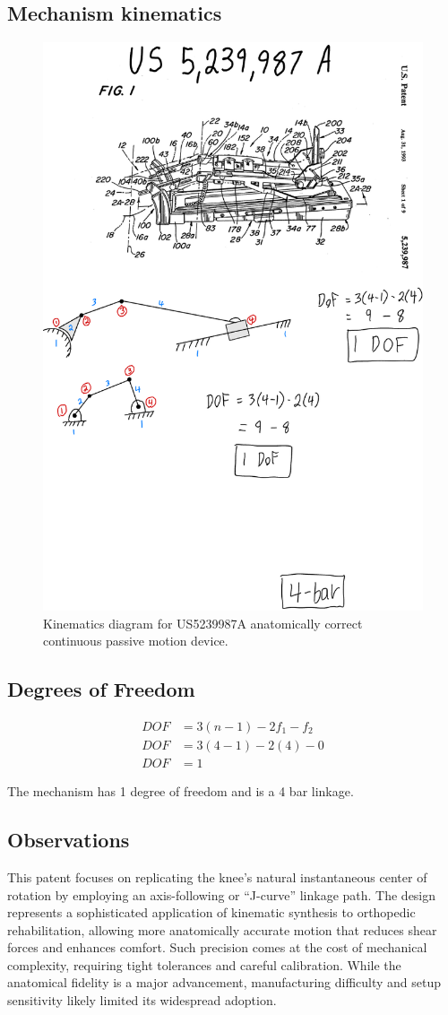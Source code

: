 \documentclass[11pt]{article}
\begin{document}
\subsection{Mechanism kinematics}
\begin{figure}[H]
  \centering
  \includegraphics[width=0.54\linewidth]{../Kinematic Mechanism Images/5239987.png}
  \caption{Kinematics diagram for US5239987A anatomically correct continuous passive motion device.}
  \label{fig:US5239987A_kinematics}
\end{figure}

\subsection{Degrees of Freedom}
\[
\begin{aligned}
DOF &= 3(n-1) - 2f_1 - f_2 \\
DOF &= 3(4-1) - 2(4) - 0 \\
DOF &= 1
\end{aligned}
\]

The mechanism has 1 degree of freedom and is a 4 bar linkage.

\subsection{Observations}
This patent focuses on replicating the knee's natural instantaneous center of rotation by employing an axis-following or ``J-curve'' linkage path. The design represents a sophisticated application of kinematic synthesis to orthopedic rehabilitation, allowing more anatomically accurate motion that reduces shear forces and enhances comfort. Such precision comes at the cost of mechanical complexity, requiring tight tolerances and careful calibration. While the anatomical fidelity is a major advancement, manufacturing difficulty and setup sensitivity likely limited its widespread adoption.
\end{document}
